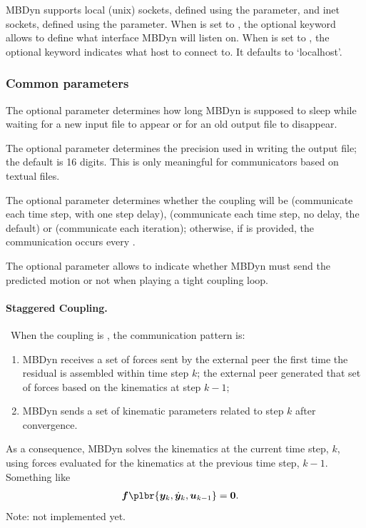MBDyn supports local (unix) sockets, defined using the  parameter,
and inet sockets, defined using the  parameter.
When  is set to , the optional keyword 
allows to define what interface MBDyn will listen on.
When  is set to , the optional keyword 
indicates what host to connect to.
It defaults to `localhost'.




\subsubsection{Common parameters}
The optional parameter  determines how long MBDyn
is supposed to sleep while waiting for a new input file to appear
or for an old output file to disappear.

The optional parameter  determines the precision
used in writing the output file; the default is 16 digits.
This is only meaningful for communicators based on textual files.

The optional parameter  determines whether the coupling
will be  (communicate each time step, with one step delay),
 (communicate each time step, no delay, the default) or
 (communicate each iteration); otherwise, if 
is provided, the communication occurs every .

The optional parameter  allows to indicate
whether MBDyn must send the predicted motion or not when playing
a tight coupling loop.


\paragraph{Staggered Coupling.} \
When the coupling is , the communication pattern is:
\begin{enumerate}
\item MBDyn receives a set of forces sent by the external peer
	the first time the residual is assembled within time step $k$;
	the external peer generated that set of forces
	based on the kinematics at step $k-1$;

\item MBDyn sends a set of kinematic parameters related to step $k$
	after convergence.
\end{enumerate}
As a consequence, MBDyn solves the kinematics at the current time step, $k$,
using forces evaluated for the kinematics at the previous time step, $k-1$.
Something like
\begin{align}
	\T{f}\plbr{\T{y}_k, \dot{\T{y}}_k, \T{u}_{k - 1}}
	&=
	\T{0}
	.
\end{align}
Note: not implemented yet.

